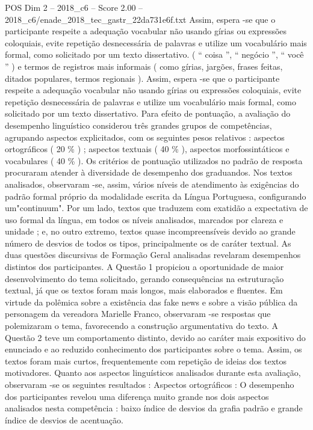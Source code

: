 \begin{textsample}{POS Dim 2 – 2018\_c6 – Score 2.00 – 2018\_c6/enade\_2018\_tec\_gastr\_22da731e6f.txt}
Assim, espera -se que o participante respeite a adequação vocabular não usando gírias ou expressões coloquiais, evite repetição desnecessária de palavras e utilize um vocabulário mais formal, como solicitado por um texto dissertativo. ( “ coisa ”, “ negócio ”, “ você ” ) e termos de registros mais informais ( como gírias, jargões, frases feitas, ditados populares, termos regionais ).
Assim, espera -se que o participante respeite a adequação vocabular não usando gírias ou expressões coloquiais, evite repetição desnecessária de palavras e utilize um vocabulário mais formal, como solicitado por um texto dissertativo.
Para efeito de pontuação, a avaliação do desempenho linguístico considerou três grandes grupos de competências, agrupando aspectos explicitados, com os seguintes pesos relativos : aspectos ortográficos ( 20 \% ) ; aspectos textuais ( 40 \% ), aspectos morfossintáticos e vocabulares ( 40 \% ).
Os critérios de pontuação utilizados no padrão de resposta procuraram atender à diversidade de desempenho dos graduandos.
Nos textos analisados, observaram -se, assim, vários níveis de atendimento às exigências do padrão formal próprio da modalidade escrita da Língua Portuguesa, configurando um"continuum".
Por um lado, textos que traduzem com exatidão a expectativa de uso formal da língua, em todos os níveis analisados, marcados por clareza e unidade ; e, no outro extremo, textos quase incompreensíveis devido ao grande número de desvios de todos os tipos, principalmente os de caráter textual.
As duas questões discursivas de Formação Geral analisadas revelaram desempenhos distintos dos participantes.
A Questão 1 propiciou a oportunidade de maior desenvolvimento do tema solicitado, gerando consequências na estruturação textual, já que os textos foram mais longos, mais elaborados e fluentes.
Em virtude da polêmica sobre a existência das fake news e sobre a visão pública da personagem da vereadora Marielle Franco, observaram -se respostas que polemizaram o tema, favorecendo a construção argumentativa do texto.
A Questão 2 teve um comportamento distinto, devido ao caráter mais expositivo do enunciado e ao reduzido conhecimento dos participantes sobre o tema.
Assim, os textos foram mais curtos, frequentemente com repetição de ideias dos textos motivadores.
Quanto aos aspectos linguísticos analisados durante esta avaliação, observaram -se os seguintes resultados : Aspectos ortográficos : O desempenho dos participantes revelou uma diferença muito grande nos dois aspectos analisados nesta competência : baixo índice de desvios da grafia padrão e grande índice de desvios de acentuação.

\end{textsample}
